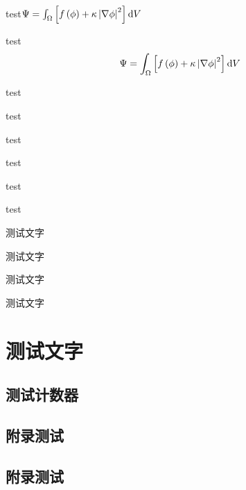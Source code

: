 \Improve
\begin{QuestionItem}[2]
	\item test$\Psi=\int_\Omega\left[f\left(\phi\right)+\kappa\left|\nabla\phi\right|^2\right]{\rm d}V$
	\item test
	$$\Psi=\int_\Omega\left[f\left(\phi\right)+\kappa\left|\nabla\phi\right|^2\right]{\rm d}V$$
	\item test
	\item test
	\item test
	\item test
	\item test
	\item test
\end{QuestionItem}


\Thinking
\begin{QuestionItem}
	\item 测试文字
	\item 测试文字
	\item 测试文字
	\item 测试文字
\end{QuestionItem}






%


\chapter{测试文字}

\zhlipsum

%


\begin{Appendix*}
	
\chapter{测试计数器}
	
\section{附录测试}

\section{附录测试}

\end{Appendix*}


